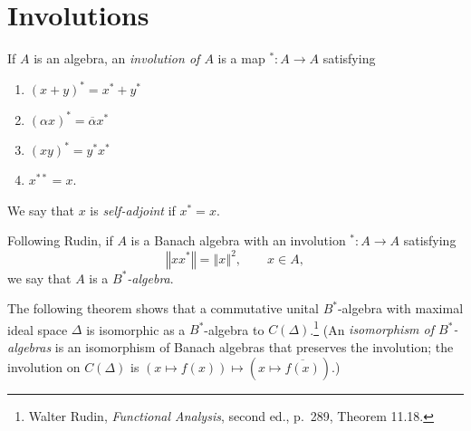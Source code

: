 \documentclass{article}
\newcommand{\norm}[1]{\left\Vert #1 \right\Vert}
\theoremstyle{definition}
\theoremstyle{definition}
\begin{document}
\section{Involutions}
If $A$ is an algebra, an {\em involution of $A$} is a map $^*:A \to A$ satisfying
\begin{enumerate}
\item $(x+y)^* = x^*+y^*$
\item $(\alpha x)^*=\overline{\alpha} x^*$
\item $(xy)^*=y^*x^*$
\item $x^{**}=x$.
\end{enumerate}
We say that $x$ is {\em self-adjoint} if $x^*=x$.

Following Rudin, if $A$ is a Banach algebra with an involution $^*:A \to A$ satisfying 
\[
\norm{xx^*}=\norm{x}^2, \qquad x \in A,
\]
we say that $A$ is a {\em $B^*$-algebra}.

The following theorem shows that a commutative unital $B^*$-algebra with maximal ideal space $\Delta$ is isomorphic as a $B^*$-algebra
to $C(\Delta)$.\footnote{Walter Rudin, {\em Functional Analysis}, second ed., p.~289, Theorem 11.18.} (An
{\em isomorphism of $B^*$-algebras} is an isomorphism of Banach algebras that preserves the involution;
the involution on $C(\Delta)$ is $(x \mapsto f(x)) \mapsto (x \mapsto \overline{f(x)})$.)
\end{document}
